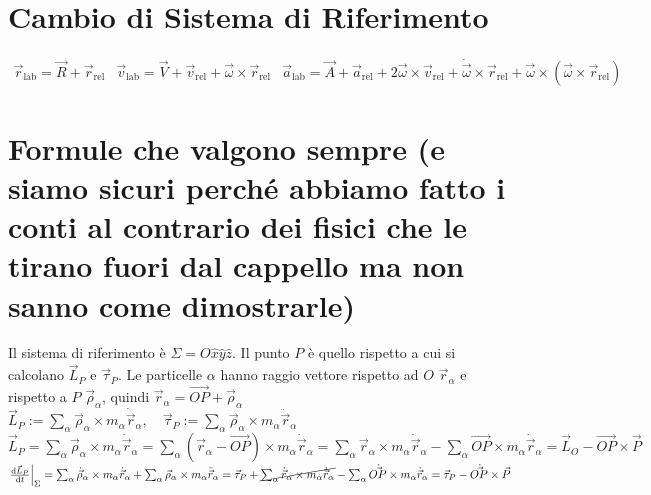 \documentclass[a4paper,NoNotes,GeneralMath,12pt]{stdmdoc}
\begin{document}
	\section*{Cambio di Sistema di Riferimento}
	$\begin{array}{ccc} \vec{r}_{\text{lab}} = \vec{R} + \vec{r}_{\text{rel}} & \vec{v}_{\text{lab}} = \vec{V} + \vec{v}_{\text{rel}} + \vec{\omega} \times \vec{r}_{\text{rel}} & \vec{a}_{\text{lab}} = \vec{A} + \vec{a}_{\text{rel}} + 2 \vec{\omega} \times \vec{v}_{\text{rel}} + \dot{\vec{\omega}} \times \vec{r}_{\text{rel}} + \vec{\omega} \times \left( \vec{\omega} \times \vec{r}_{\text{rel}} \right) \end{array}$

	\section*{Formule che valgono sempre (e siamo sicuri perché abbiamo fatto i conti al contrario dei fisici che le tirano fuori dal cappello ma non sanno come dimostrarle)}
	Il sistema di riferimento è $\Sigma = O\hat{x}\hat{y}\hat{z}$. Il punto $P$ è quello rispetto a cui si calcolano $\vec{L}_P$ e $\vec{\tau}_P$. Le particelle $\alpha$ hanno raggio vettore rispetto ad $O$ $\vec{r}_\alpha$ e rispetto a $P$ $\vec{\rho}_\alpha$, quindi $\vec{r}_\alpha = \vec{OP} + \vec{\rho}_\alpha$ \\
	$\vec{L}_P := \sum_\alpha \vec{\rho}_\alpha \times m_\alpha \dot{\vec{r}}_\alpha , \quad \vec{\tau}_P := \sum_\alpha \vec{\rho}_\alpha \times m_\alpha \ddot{\vec{r}}_\alpha$ \\
	$\vec{L}_P = \sum_\alpha \vec{\rho}_\alpha \times m_\alpha \dot{\vec{r}}_\alpha = \sum_\alpha \left( \vec{r}_\alpha - \vec{OP} \right) \times m_\alpha \dot{\vec{r}}_\alpha = \sum_\alpha \vec{r}_\alpha \times m_\alpha \dot{\vec{r}}_\alpha - \sum_\alpha \vec{OP} \times m_\alpha \dot{\vec{r}}_\alpha = \vec{L}_O - \vec{OP} \times \vec{P}$ \\
	$\left. \de{\vec{L}_P}{t}\right|_\Sigma = \sum_\alpha \dot{\vec{\rho}}_\alpha \times m_\alpha \dot{\vec{r}}_\alpha +\sum_\alpha {\vec{\rho}}_\alpha \times m_\alpha \ddot{\vec{r}}_\alpha = \vec{\tau}_P + \cancel{\sum_\alpha \dot{\vec{r}}_\alpha \times m_\alpha \dot{\vec{r}}_\alpha } - \sum_\alpha \dot{\vec{OP}} \times m_\alpha \dot{\vec{r}}_\alpha = \vec{\tau}_P - \dot{\vec{OP}} \times \vec{P}$
\end{document}
